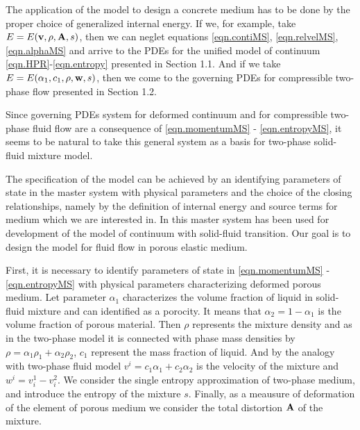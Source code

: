 \documentclass[3p,times]{elsarticle}
\begin{document}
The application of the model to design a concrete medium has to be done by the proper choice of generalized internal energy. If we, for example, take $E=E({\bf v},\rho,{\bf A},s)$, then we can neglet equations \eqref{eqn.contiMS}, \eqref{eqn.relvelMS}, \eqref{eqn.alphaMS} and arrive to the PDEs for the unified model of continuum \eqref{eqn.HPR}-\eqref{eqn.entropy} presented in Section 1.1.
And if we take $E=E(\alpha_1, c_1, \rho, {\bf w}, s)$, then we come to the governing PDEs for compressible two-phase flow presented in Section 1.2.

Since governing PDEs system for deformed continuum and for compressible two-phase fluid flow are a consequence of \eqref{eqn.momentumMS} - \eqref{eqn.entropyMS}, it seems to be natural to take this general system as a basis for two-phase solid-fluid mixture model. 

The specification of the model can be achieved by an identifying parameters of state in the master system with physical parameters and the choice of the closing relationships, namely by the definition of internal energy and source terms for medium which we are interested in.
In \cite{Peshkov2015} this master system has been used for development of the model of continuum with solid-fluid transition. Our goal is to design the model for fluid flow in porous elastic medium. 

First, it is necessary to identify parameters of state in \eqref{eqn.momentumMS} - \eqref{eqn.entropyMS} with physical parameters characterizing deformed porous medium.
Let parameter $\alpha_1$ characterizes the volume fraction of liquid in solid-fluid mixture and can identified as a porocity. It means that $\alpha_2=1-\alpha_1$ is the volume fraction of porous material. Then $\rho$ represents the mixture density and as in the two-phase model it is connected with phase mass densities by $\rho=\alpha_1\rho_1+\alpha_2\rho_2$, $c_1$ represent the mass fraction of liquid. And by the analogy with two-phase fluid model $v^i=c_1\alpha_1+c_2\alpha_2$ is the velocity of the mixture and $w^i=v^1_i-v^2_i$. 
We consider the single entropy approximation of two-phase medium, and introduce the entropy of the mixture $s$. Finally, as a meausure of deformation of the element of porous medium we consider the total distortion $\bf A$ of the mixture.  
\end{document}

